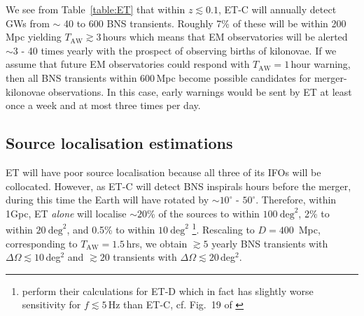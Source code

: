 \documentclass{aa}
\begin{document}
We see from Table~\ref{table:ET} that %
within $z\lesssim 0.1$, %
ET-C will annually detect GWs from $\sim$ 40 to 600 BNS transients.
Roughly 7\% of these will be within 200\,Mpc yielding $T_\text{AW}\gtrsim 3\,$hours which means that EM observatories will be alerted $\sim 3$ - 40 times yearly with the prospect of observing births of kilonovae.
If we assume that future EM observatories could respond with $T_\text{AW}=1\,$hour warning, then
all BNS transients within 600\,Mpc become possible candidates for merger-kilonovae observations.
In this case, early warnings would be sent by ET at least once a week and at most three times per day.

\subsection{Source localisation estimations}
ET will have poor source localisation because all three of its IFOs will be collocated. 
However, as ET-C will
detect BNS inspirals hours before the merger, during this time the Earth will have rotated by $\sim 10^\circ$ - $50^\circ$.
Therefore, within 1Gpc, ET \emph{alone} will localise  $\sim20$\% of the sources to within $100~\mathrm{deg}^2$, 
2\% to within $20~\mathrm{deg}^2$, and 0.5\% to within $10~\mathrm{deg}^2$ \citep{Zhao:2017cbb} 
\footnote{\cite{Zhao:2017cbb} perform their calculations for ET-D which in fact has slightly worse sensitivity for $f\lesssim 5\,$Hz than ET-C, cf. Fig.~19 of \cite{GW_IFO_LRR}}.
Rescaling to $D=400$~Mpc, corresponding to $T_\text{AW}= 1.5\,$hrs, we obtain $\gtrsim 5$ yearly BNS transients with $\Delta\Omega \lesssim 10\,$deg$^2$ and $\gtrsim20$ transients with $\Delta\Omega \lesssim 20\,$deg$^2$.
\end{document}
